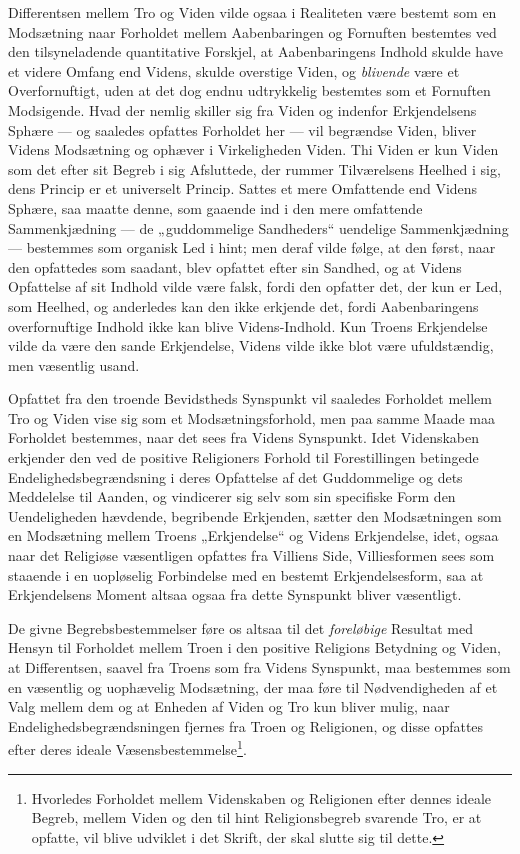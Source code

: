 \documentclass[12pt,a4paper]{book}
\newcommand{\opage}[1]{\marginnote{\footnotesize\textit{[#1]}}}
\begin{document}
Differentsen mellem Tro og Viden vilde ogsaa i Realiteten være bestemt som en
Modsætning naar Forholdet mellem Aabenbaringen og Fornuften bestemtes ved den
tilsyneladende quantitative Forskjel, at Aabenbaringens Indhold skulde have et
videre Omfang end Videns, skulde overstige Viden, og \emph{blivende} være et
Overfornuftigt, uden at det dog endnu udtrykkelig bestemtes som et Fornuften
Modsigende. Hvad der nemlig skiller sig fra Viden og indenfor Erkjendelsens
Sphære --- og saaledes opfattes Forholdet her --- vil begrændse Viden, bliver
Videns Modsætning og ophæver i Virkeligheden Viden. Thi Viden er kun Viden som
det efter sit Begreb i sig Afsluttede, der rummer Tilværelsens Heelhed i sig,
dens Princip er et universelt Princip. Sattes et mere Omfattende end Videns
Sphære, saa maatte denne, som gaaende ind i den mere omfattende Sammenkjædning
--- de „guddommelige Sandheders“ uendelige Sammenkjædning --- bestemmes som
organisk Led i hint; men deraf vilde følge, at den først, naar den opfattedes som
saadant, blev opfattet efter sin Sandhed, og at Videns Opfattelse af sit Indhold
vilde være falsk, fordi den opfatter det, der kun er Led, som Heelhed, og
anderledes kan den ikke erkjende det, fordi Aabenbaringens overfornuftige Indhold
ikke kan blive Videns-Indhold. Kun Troens Erkjendelse vilde da være den sande
Erkjendelse, Videns vilde ikke blot være ufuldstændig, men væsentlig usand.

Opfattet fra den troende Bevidstheds Synspunkt vil saaledes Forholdet mellem Tro
og Viden vise sig som et Modsætningsforhold, men paa samme Maade maa Forholdet
bestemmes, naar det sees fra Videns Synspunkt. Idet Videnskaben erkjender den ved
de positive Religioners Forhold til Forestillingen betingede
Endelighedsbegrænds\opage{42}ning i deres Opfattelse af det Guddommelige og dets Meddelelse
til Aanden, og vindicerer sig selv som sin specifiske Form den Uendeligheden
hævdende, begribende Erkjenden, sætter den Modsætningen som en Modsætning mellem
Troens „Erkjendelse“ og Videns Erkjendelse, idet, ogsaa naar det Religiøse
væsentligen opfattes fra Villiens Side, Villiesformen sees som staaende i en
uopløselig Forbindelse med en bestemt Erkjendelsesform, saa at Erkjendelsens
Moment altsaa ogsaa fra dette Synspunkt bliver væsentligt.

De givne Begrebsbestemmelser føre os altsaa til det \emph{foreløbige} Resultat med
Hensyn til Forholdet mellem Troen i den positive Religions Betydning og Viden, at
Differentsen, saavel fra Troens som fra Videns Synspunkt, maa bestemmes som en
væsentlig og uophævelig Modsætning, der maa føre til Nødvendigheden af et Valg
mellem dem og at Enheden af Viden og Tro kun bliver mulig, naar
Endelighedsbegrændsningen fjernes fra Troen og Religionen, og disse opfattes
efter deres ideale Væsensbestemmelse\footnote{Hvorledes Forholdet mellem
Videnskaben og Religionen efter dennes ideale Begreb, mellem Viden og den til
hint Religionsbegreb svarende Tro, er at opfatte, vil blive udviklet i det Skrift,
der skal slutte sig til dette.}.
\end{document}
